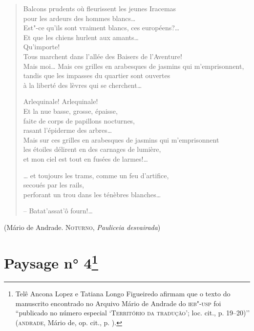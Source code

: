 \begin{verse}
Balcons prudents où fleurissent les jeunes Iracemas\\
pour les ardeurs des hommes blancs\ldots{}\\
Est"-ce qu'ils sont vraiment blancs, ces européens?\ldots{}\\
Et que les chiens hurlent aux amants\ldots{}\\
Qu'importe!\\
Tous marchent dans l'allée des Baisers de l'Aventure!\\
Mais moi\ldots{} Mais ces grilles en arabesques de jasmins qui m'emprisonnent,\\
tandis que les impasses du quartier sont ouvertes\\
à la liberté des lèvres qui se cherchent\ldots{}

Arlequinale! Arlequinale!\\
Et la nue basse, grosse, épaisse,\\
faite de corps de papillons nocturnes,\\
rasant l'épiderme des arbres\ldots{}\\
Mais sur ces grilles en arabesques de jasmins qui m'emprisonnent\\
les étoiles délirent en des carnages de lumière,\\
et mon ciel est tout en fusées de larmes!\ldots{}

\ldots{} et toujours les trams, comme un feu d'artifice,\\
secoués par les rails,\\
perforant un trou dans les ténèbres blanches\ldots{}

-- Batat'assat'ô fourn!\ldots{}
\end{verse}

\hfill(Mário de Andrade\textsc{. Noturno,} \emph{Pauliceia desvairada}\textsc{)}

\chapter{Paysage n° 4\footnote[*]{Telê Ancona Lopez e Tatiana Longo
  Figueiredo afirmam que o texto do manuscrito encontrado no Arquivo
  Mário de Andrade do \textsc{ieb"-usp} foi ``publicado no número especial
  `\textsc{Território da tradução'}; loc. cit., p. 19--20)'' (\textsc{andrade},
  Mário de, op. cit., p. ).}}


